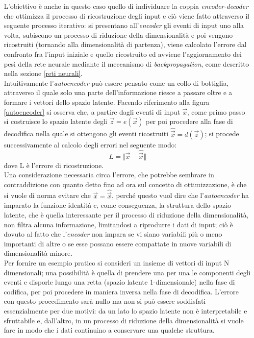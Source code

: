 L'obiettivo è anche in questo caso quello di individuare la coppia \textit{encoder-decoder} che ottimizza il processo di ricostruzione degli input e ciò viene fatto attraverso il seguente processo iterativo: si presentano all'\textit{encoder} gli eventi di input uno alla volta, subiscono un processo di riduzione della dimensionalità e poi vengono ricostruiti (tornando alla dimensionalità di partenza), viene calcolato l'errore dal confronto fra l'input iniziale e quello ricostruito ed avviene l'aggiornamento dei pesi della rete neurale mediante il meccanismo di \textit{backpropagation}, come descritto nella sezione \ref{reti neurali}. \\
Intuitivamente l'\textit{autoencoder} può essere pensato come un collo di bottiglia, attraverso il quale solo una parte dell'informazione riesce a passare oltre e a formare i vettori dello spazio latente.
Facendo riferimento alla figura \ref{autoencoder} si osserva che, a partire dagli eventi di input $\vec{x}$, come primo passo si costruisce lo spazio latente degli $\vec{z} = e(\vec{x})$ per poi procedere alla fase di decodifica nella quale si ottengono gli eventi ricostruiti $\hat{\vec{x}} = d(\vec{z})$; si procede successivamente al calcolo degli errori nel seguente modo:
\begin{equation}
	L = \Vert \vec{x} - \hat{\vec{x}} \Vert
\end{equation}
dove L è l'errore di ricostruzione.\\
Una considerazione necessaria circa l'errore, che potrebbe sembrare in contraddizione con quanto detto fino ad ora sul concetto di ottimizzazione, è che si vuole di norma evitare che $\vec{x} = \hat{\vec{x}}$, perché questo vuol dire che l'\textit{autoencoder} ha imparato la funzione identità e, come conseguenza, la struttura dello spazio latente, che è quella interessante per il processo di riduzione della dimensionalità, non filtra alcuna informazione, limitandosi a riprodurre i dati di input; ciò è dovuto al fatto che l'\textit{encoder} non impara se vi siano variabili più o meno importanti di altre o se esse possano essere compattate in nuove variabili di dimensionalità minore. \\
Per fornire un esempio pratico si consideri un insieme di vettori di input N dimensionali; una possibilità è quella di prendere una per una le componenti degli eventi e disporle lungo una retta (spazio latente 1-dimensionale) nella fase di codifica, per poi procedere in maniera inversa nella fase di decodifica. L'errore con questo procedimento sarà nullo ma non si può essere soddisfati essenzialmente per due motivi: da un lato lo spazio latente non è interpretabile e sfruttabile e, dall'altro, in un processo di riduzione della dimensionalità si vuole fare in modo che i dati continuino a conservare una qualche struttura. \\
